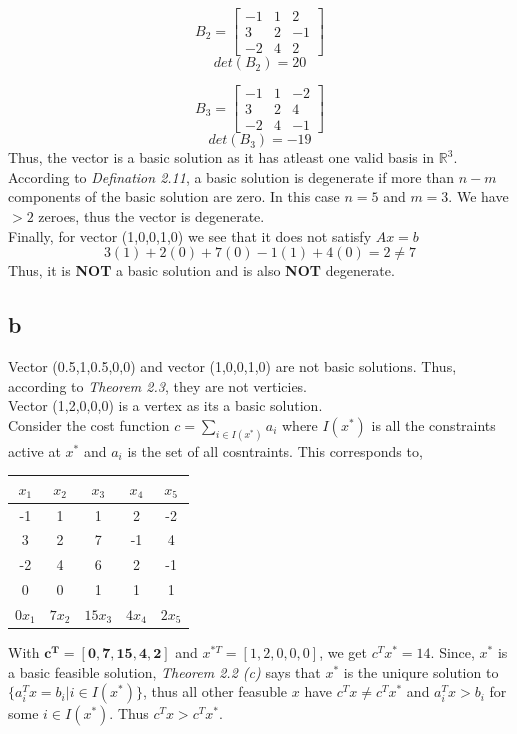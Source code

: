 \documentclass[11pt]{article}
\begin{document}
\[B_2  =  \begin{bmatrix}
    -1 & 1 & 2  \\
    3 & 2 & -1 \\
    -2 & 4 & 2 
    \end{bmatrix}\]
\[det(B_2) = 20\]

\[B_3  =  \begin{bmatrix}
    -1 & 1 & -2  \\
    3 & 2 & 4 \\
    -2 & 4 & -1 
    \end{bmatrix}\]
\[det(B_3) = -19\]
Thus, the vector is a basic solution as it has atleast one valid basis in $\mathbb{R}^3$. According to \textit{Defination 2.11}, a basic solution is degenerate if more than $n-m$ components of the basic solution are zero. In this case $n = 5$ and $m = 3$. We have $ > 2$ zeroes, thus the vector is degenerate.\\

Finally, for vector (1,0,0,1,0) we see that it does not satisfy $Ax = b$
\[3(1) + 2(0) + 7(0) -1(1) +4(0) = 2 \ne 7\]
Thus, it is \textbf{NOT} a basic solution and is also \textbf{NOT} degenerate.

\subsection*{b}
Vector (0.5,1,0.5,0,0) and vector (1,0,0,1,0) are not basic solutions. Thus, according to \textit{Theorem 2.3}, they are not verticies. \\
Vector (1,2,0,0,0) is a vertex as its a basic solution. \\
Consider the cost function $c = \sum_{i \in I(x^*)} a_i$ where $I(x^*)$ is all the constraints active at $x^*$ and $a_i$ is the set of all cosntraints. This corresponds to, 

\begin{table}[h]
    \centering
    \begin{tabular}{|c|c|c|c|c|}
    \hline
    \textbf{$x_1$} & \textbf{$x_2$} & \textbf{$x_3$} & \textbf{$x_4$} & \textbf{$x_5$}\\ \hline
    -1 & 1 & 1 & 2 & -2 \\ 
    3 & 2 & 7 & -1 & 4 \\ 
    -2 & 4 & 6 & 2 & -1 \\ 
    0 & 0 & 1 & 1 & 1 \\ \hline
    $0x_1$ & $7x_2$ & $15x_3$ & $4x_4$ & $2x_5$ \\ \hline
    \end{tabular}
    \end{table}
With $\mathbf{c^T = [0,7,15,4,2]}$ and $x^{*T} = [1,2,0,0,0]$, we get $c^Tx^* = 14$. Since, $x^*$ is a basic feasible solution, \textit{Theorem 2.2 (c)} says that $x^*$ is the uniqure solution to $\{ a_{i}^T x = b_i | i \in I(x^*)\}$, thus all other feasuble $x$ have $c^T x \ne c^T x^*$ and $a_{i}^T x > b_i$ for some $i \in I(x^*)$. Thus $c^T x > c^T x^*$.
\end{document}
